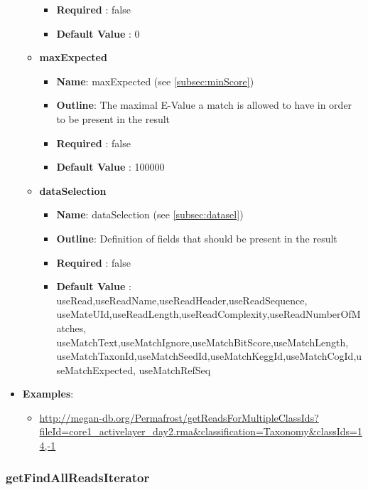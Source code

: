 \documentclass[11pt]{article}
\begin{document}
\begin{itemize}
\begin{itemize}
\begin{itemize}
					\item \textbf{Required} : false
					\item \textbf{Default Value} : 0
				\end{itemize}
			\item \textbf{maxExpected}
				\begin{itemize}
					\item \textbf{Name}: maxExpected (see \ref{subsec:minScore})
					\item \textbf{Outline}: The maximal E-Value a match is allowed to have in order to be present in the result
					\item \textbf{Required} : false
					\item \textbf{Default Value} : 100000
				\end{itemize}
			\item \textbf{dataSelection}
				\begin{itemize}
					\item \textbf{Name}: dataSelection (see \ref{subsec:datasel})
					\item \textbf{Outline}: Definition of fields that should be present in the result
					\item \textbf{Required} : false
					\item \textbf{Default Value} : useRead,useReadName,useReadHeader,useReadSequence, useMateUId,useReadLength,useReadComplexity,useReadNumberOfMatches, useMatchText,useMatchIgnore,useMatchBitScore,useMatchLength, useMatchTaxonId,useMatchSeedId,useMatchKeggId,useMatchCogId,useMatchExpected, useMatchRefSeq
				\end{itemize}
		\end{itemize}
	\item \textbf{Examples}:
		\begin{itemize}
			\item \url{http://megan-db.org/Permafrost/getReadsForMultipleClassIds?fileId=core1_activelayer_day2.rma&classification=Taxonomy&classIds=14,-1}
		\end{itemize}
\end{itemize}
\subsubsection{getFindAllReadsIterator}
\end{document}
